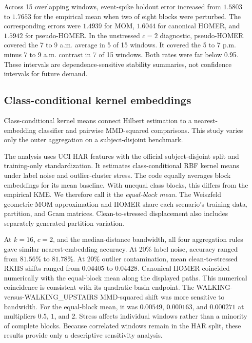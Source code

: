 \documentclass[twoside]{article}
\theoremstyle{definition}
\begin{document}
Across 15 overlapping windows, event-spike holdout error increased from $1.5803$ to $1.7653$ for the empirical mean when two of eight blocks were perturbed. The corresponding errors were $1.4939$ for MOM, $1.6044$ for canonical HOMER, and $1.5942$ for pseudo-HOMER. In the unstressed $c=2$ diagnostic, pseudo-HOMER covered the 7 to 9 a.m. average in 5 of 15 windows. It covered the 5 to 7 p.m. minus 7 to 9 a.m. contrast in 7 of 15 windows. Both rates were far below 0.95. These intervals are dependence-sensitive stability summaries, not confidence intervals for future demand.

\subsection{Class-conditional kernel embeddings}

Class-conditional kernel means connect Hilbert estimation to a nearest-embedding classifier and pairwise MMD-squared comparisons. This study varies only the outer aggregation on a subject-disjoint benchmark.

The analysis uses UCI HAR features \citep{jorgereyes-ortiz_2013_HumanActivityRecognition} with the official subject-disjoint split and training-only standardization. It estimates class-conditional RBF kernel means under label noise and outlier-cluster stress. The code equally averages block embeddings for its mean baseline. With unequal class blocks, this differs from the empirical KME. We therefore call it the \emph{equal-block mean}. The Weiszfeld geometric-MOM approximation and HOMER share each scenario's training data, partition, and Gram matrices. Clean-to-stressed displacement also includes separately generated partition variation.

At $k=16$, $c=2$, and the median-distance bandwidth, all four aggregation rules gave similar nearest-embedding accuracy. At 20\% label noise, accuracy ranged from $81.56\%$ to $81.78\%$. At 20\% outlier contamination, mean clean-to-stressed RKHS shifts ranged from $0.04405$ to $0.04428$. Canonical HOMER coincided numerically with the equal-block mean along the displayed paths. This numerical coincidence is consistent with its quadratic-basin endpoint. The WALKING-versus-WALKING\_UPSTAIRS MMD-squared shift was more sensitive to bandwidth. For the equal-block mean, it was $0.00549$, $0.000163$, and $0.000271$ at multipliers $0.5$, $1$, and $2$. Stress affects individual windows rather than a minority of complete blocks. Because correlated windows remain in the HAR split, these results provide only a descriptive sensitivity analysis.
\end{document}
